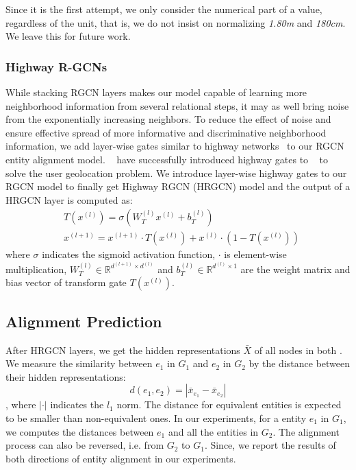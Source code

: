 	Since it is the first attempt, we only consider the numerical part of a value, regardless of the unit, that is, we do not insist on normalizing \emph{1.80m} and \emph{180cm}.
	We leave this for future work.


	\subsubsection{Highway R-GCNs}
	\label{section:hgcn}
	While stacking RGCN layers makes our model capable of learning more neighborhood information from several relational steps, it may as well bring noise from the exponentially increasing neighbors. To reduce the effect of noise and ensure effective spread of more informative and discriminative neighborhood information, we add layer-wise gates similar to highway networks~\cite{Srivastava2015Highway} to our RGCN entity alignment model. ~\cite{Rahimi2018Semi} have successfully introduced highway gates to \GCNs~\cite{Kipf2016Semi} to solve the user geolocation problem. We introduce layer-wise highway gates to our RGCN model to finally get Highway RGCN (HRGCN) model and the output of a HRGCN layer is computed as:
	\begin{equation}
	\begin{split}
	&T(x^{(l)})=\sigma(W_T^{(l)}x^{(l)}+b_T^{(l)}) \\
	&x^{(l+1)}=x^{(l+1)} \cdot T(x^{(l)})+x^{(l)} \cdot (1-T(x^{(l)}))
	\end{split}
	\end{equation}
	where $\sigma$ indicates the sigmoid activation function, $\cdot$ is element-wise multiplication, $W_T^{(l)} \in \mathbb{R}^{d^{(l+1)} \times d^{(l)}}$ and $b_T^{(l)} \in \mathbb{R}^{d^{(l)} \times 1}$ are the weight matrix and bias vector of transform gate $T(x^{(l)})$.
	
	\subsection{Alignment Prediction}
	After HRGCN layers, we get the hidden representations $\bar{X}$ of all nodes in both \KGs. We measure the similarity between $e_1$ in $G_1$ and $e_2$ in $G_2$ by the distance between their hidden representations:
	\begin{equation}
	\label{d}
	d(e_1,e_2)=|\bar{x}_{e_1}-\bar{x}_{e_2}|
	\end{equation}
	, where $|\cdot|$ indicates the $l_1$ norm. The distance for equivalent entities is expected to be smaller than non-equivalent ones. In our experiments, for a entity $e_1$ in $G_1$, we computes the distances between $e_1$ and all the entities in $G_2$. The alignment process can also be reversed, i.e. from $G_2$ to $G_1$. Since, we report the results of both directions of entity alignment in our experiments.
	
